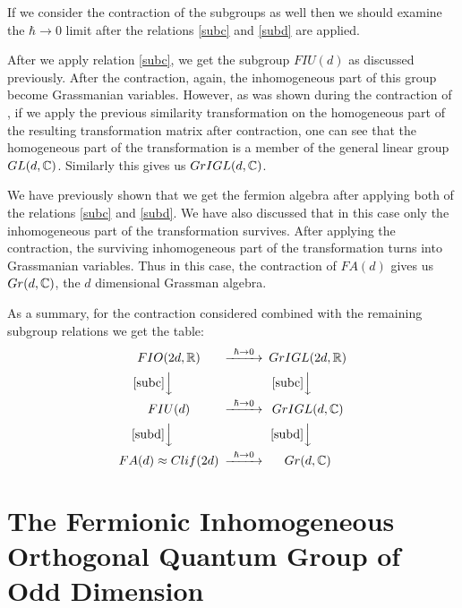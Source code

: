 If we consider the contraction of the subgroups as well then we
should examine the $\hbar \rightarrow 0$ limit after the relations
\eqref{subc} and \eqref{subd} are applied.

After we apply relation \eqref{subc}, we get the subgroup $FIU(d)$
as discussed previously. After the contraction,
again, the inhomogeneous part of this group become
Grassmanian variables. However, as was shown during the contraction
of \BISp, if we apply the previous similarity
transformation on the homogeneous part of the resulting transformation
matrix after contraction, one can see that the
homogeneous part of the transformation is a member of the general
linear group $GL(d, \mathbb{C})$. Similarly this gives us $GrIGL(d, \mathbb{C})$.

We have previously shown that we get the fermion
algebra after applying both of the relations \eqref{subc} and
\eqref{subd}. We have also discussed that in this case only the
inhomogeneous part of the transformation survives. After
applying the contraction, the surviving inhomogeneous part of the
transformation turns into Grassmanian variables. Thus
in this case, the contraction of $FA(d)$ gives us $Gr(d, \mathbb{C})$,
the $d$ dimensional Grassman algebra.

As a summary, for the contraction considered combined with the
remaining subgroup relations we get the table:
\[
\begin{CD}
{FIO(2d, \IR)}            @> \hbar \rightarrow 0 >> {GrIGL(2d, \IR)} \\
@V\eqref{subc}VV                                    @V\eqref{subc}VV \\
{FIU(d)}                  @> \hbar \rightarrow 0 >> {GrIGL(d, \IC)} \\
@V\eqref{subd}VV                                    @V\eqref{subd}VV \\
{FA(d) \approx Clif(2d)} @> \hbar \rightarrow 0 >> {Gr(d, \IC)}
\end{CD}
\]

\section{The Fermionic Inhomogeneous
Orthogonal Quantum Group of Odd Dimension}

